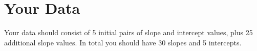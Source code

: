 \section{Your Data}
%
Your data should consist of 5 initial pairs of slope and intercept values, plus 25 additional slope values. In total you should have 30 slopes and 5 intercepts.
%
